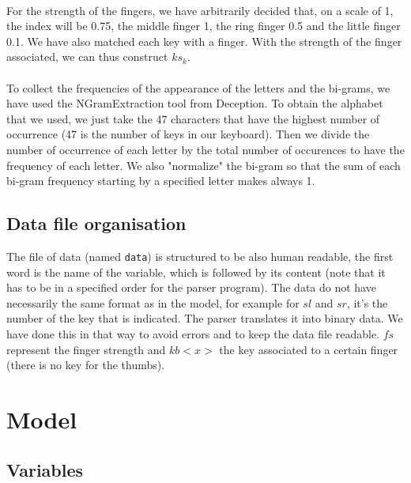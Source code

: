 \documentclass[a4paper,titlepage]{article}
\begin{document}
\paragraph{}

For the strength of the fingers, we have arbitrarily decided that, on a scale of 1, the index will be 0.75, the middle finger 1, the ring finger 0.5 and the little finger 0.1. We have also matched each key with a finger. With the strength of the finger associated, we can thus construct $ks_{k}$.

\paragraph{}

To collect the frequencies of the appearance of the letters and the bi-grams, we have used the NGramExtraction tool from Deception. To obtain the alphabet that we used, we just take the 47 characters that have the highest number of occurrence (47 is the number of keys in our keyboard). Then we divide the number of occurrence of each letter by the total number of occurences to have the frequency of each letter. We also "normalize" the bi-gram so that the sum of each bi-gram frequency starting by a specified letter makes always 1.\\

	\subsection{Data file organisation}

The file of data (named \texttt{data}) is structured to be also human readable, the first word is the name of the variable, which is followed by its content (note that it has to be in a specified order for the parser program).
The data do not have necessarily the same format as in the model, for example for $sl$ and $sr$, it's the number of the key that is indicated. The parser translates it into binary data. We have done this in that way to avoid errors and to keep the data file readable.
$fs$ represent the finger strength and $kb<x>$ the key associated to a certain finger (there is no key for the thumbs).



\section{Model}

	\subsection{Variables}
\end{document}
